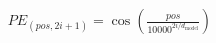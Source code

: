 \documentclass[preview]{standalone}
\begin{document}
\begin{align*}
PE_{(pos, 2i+1)} = \cos\left(\frac{pos}{10000^{2i/d_{\text{model}}}}\right)
\end{align*}
\end{document}
